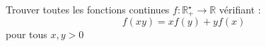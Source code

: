 Trouver toutes les fonctions continues $f : \mathbb{R}_+^\star \to \mathbb{R}$ vérifiant :
\[
f(xy) = xf(y) + yf(x)
\]
pour tous $x, y > 0$
